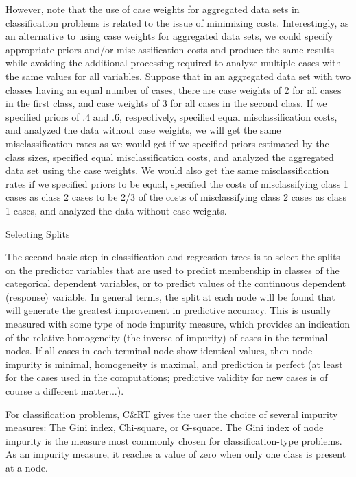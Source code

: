 However, note that the use of case weights for aggregated data sets in classification problems is related to the issue of minimizing costs. Interestingly, as an alternative to using case weights for aggregated data sets, we could specify appropriate priors and/or misclassification costs and produce the same results while avoiding the additional processing required to analyze multiple cases with the same values for all variables. Suppose that in an aggregated data set with two classes having an equal number of cases, there are case weights of 2 for all cases in the first class, and case weights of 3 for all cases in the second class. If we specified priors of .4 and .6, respectively, specified equal misclassification costs, and analyzed the data without case weights, we will get the same misclassification rates as we would get if we specified priors estimated by the class sizes, specified equal misclassification costs, and analyzed the aggregated data set using the case weights. We would also get the same misclassification rates if we specified priors to be equal, specified the costs of misclassifying class 1 cases as class 2 cases to be 2/3 of the costs of misclassifying class 2 cases as class 1 cases, and analyzed the data without case weights.

Selecting Splits

The second basic step in classification and regression trees is to select the splits on the predictor variables that are used to predict membership in classes of the categorical dependent variables, or to predict values of the continuous dependent (response) variable. In general terms, the split at each node will be found that will generate the greatest improvement in predictive accuracy. This is usually measured with some type of node impurity measure, which provides an indication of the relative homogeneity (the inverse of impurity) of cases in the terminal nodes. If all cases in each terminal node show identical values, then node impurity is minimal, homogeneity is maximal, and prediction is perfect (at least for the cases used in the computations; predictive validity for new cases is of course a different matter...).

For classification problems, C&RT gives the user the choice of several impurity measures: The Gini index, Chi-square, or G-square. The Gini index of node impurity is the measure most commonly chosen for classification-type problems. As an impurity measure, it reaches a value of zero when only one class is present at a node. 


